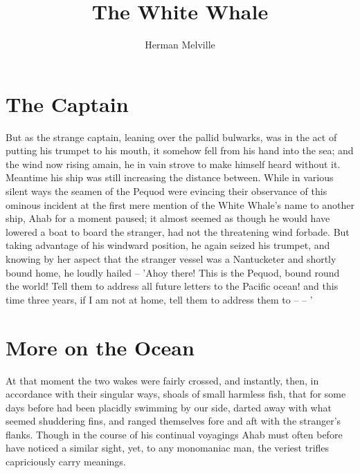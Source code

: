 \documentclass{article}
\begin{document}
\title{The White Whale}
\author{Herman Melville}
\maketitle

\section*{The Captain}

 But as the strange captain, leaning over the pallid bulwarks, was in the act of putting his trumpet to his mouth, it somehow fell from his hand into the sea; and the wind now rising amain, he in vain strove to make himself heard without it. Meantime his ship was still increasing the distance between. While in various silent ways the seamen of the Pequod were evincing their observance of this ominous incident at the first mere mention of the White Whale's name to another ship, Ahab for a moment paused; it almost seemed as though he would have lowered a boat to board the stranger, had not the threatening wind forbade. But taking advantage of his windward position, he again seized his trumpet, and knowing by her aspect that the stranger vessel was a Nantucketer and shortly bound home, he loudly hailed -- 'Ahoy there! This is the Pequod, bound round the world! Tell them to address all future letters to the Pacific ocean! and this time three years, if I am not at home, tell them to address them to -- -- '

\section{More on the Ocean}

   At that moment the two wakes were fairly crossed, and instantly, then, in accordance with their singular ways, shoals of small harmless fish, that for some days before had been placidly swimming by our side, darted away with what seemed shuddering fins, and ranged themselves fore and aft with the stranger's flanks. Though in the course of his continual voyagings Ahab must often before have noticed a similar sight, yet, to any monomaniac man, the veriest trifles capriciously carry meanings. 
\end{document}
